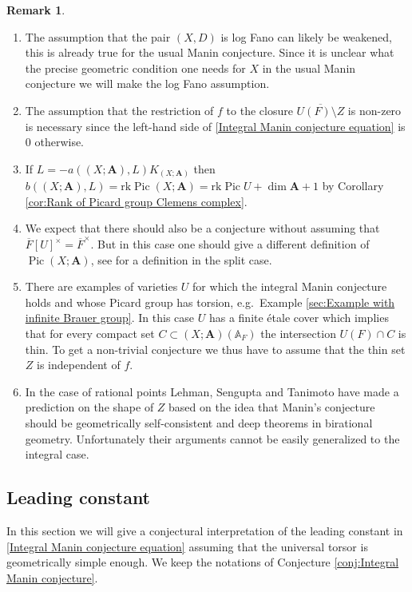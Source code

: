 \documentclass[a4paper,11pt,reqno]{amsart}
\newcommand{\A}{\mathbb{A}}
\DeclareMathOperator{\Pic}{Pic}
\theoremstyle{definition}
\newtheorem{remark}[theorem]{Remark}
\begin{document}
\begin{remark} \hfill
	\begin{enumerate}
		\item The assumption that the pair $(X,D)$ is log Fano can likely be weakened, this is already true for the usual Manin conjecture. Since it is unclear what the precise geometric condition one needs for $X$ in the usual Manin conjecture we will make the log Fano assumption.
		
		\item The assumption that the restriction of $f$ to the closure $\overline{U(F) \setminus Z}$ is non-zero is necessary since the left-hand side of \eqref{Integral Manin conjecture equation} is $0$ otherwise.
		
		\item If $L = -a((X; \mathbf{A}), L) K_{(X ; \mathbf{A})}$ then $b((X ; \mathbf{A}), L) = \text{rk} \Pic (X ; \mathbf{A}) = \text{rk} \Pic U + \dim \mathbf{A} + 1$ by Corollary \ref{cor:Rank of Picard group Clemens complex}.
		
		\item We expect that there should also be a conjecture without assuming that $\overline{F}[U]^{\times} = \overline{F}^{\times}$. But in this case one should give a different definition of $\Pic (X ; \mathbf{A})$, see \cite[Def.~2.2.1]{Wilsch2022Integral} for a definition in the split case.
		
		\item There are examples of varieties $U$ for which the integral Manin conjecture holds and whose Picard group has torsion, e.g.~Example \ref{sec:Example with infinite Brauer group}. In this case $U$ has a finite \'etale cover which implies that for every compact set $C \subset (X; \mathbf{A})(\A_F)$ the intersection $U(F) \cap C$ is thin. To get a non-trivial conjecture we thus have to assume that the thin set $Z$ is independent of $f$. 
		
		\item In the case of rational points Lehman, Sengupta and Tanimoto have made a prediction \cite{Lehman2022Geometric} on the shape of $Z$ based on the idea that Manin's conjecture should be geometrically self-consistent and deep theorems in birational geometry. Unfortunately their arguments cannot be easily generalized to the integral case.
	\end{enumerate}
\end{remark}
\subsection{Leading constant}
In this section we will give a conjectural interpretation of the leading constant in \eqref{Integral Manin conjecture equation} assuming that the universal torsor is geometrically simple enough. We keep the notations of Conjecture \ref{conj:Integral Manin conjecture}.
\end{document}
